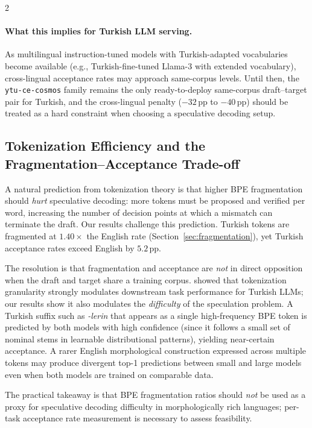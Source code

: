 \documentclass[11pt,a4paper]{article}
\begin{document}
\begin{multicols}{2}
\paragraph{What this implies for Turkish LLM serving.}
As multilingual instruction-tuned models with Turkish-adapted
vocabularies become available (e.g., Turkish-fine-tuned Llama-3 with
extended vocabulary), cross-lingual acceptance rates may approach
same-corpus levels.
Until then, the \texttt{ytu-ce-cosmos} family remains the only
ready-to-deploy same-corpus draft--target pair for Turkish, and
the cross-lingual penalty ($-32$\,pp to $-40$\,pp) should be treated
as a hard constraint when choosing a speculative decoding setup.

\subsection{Tokenization Efficiency and the Fragmentation--Acceptance Trade-off}
\label{sec:disc-tokenization}

A natural prediction from tokenization theory is that higher BPE
fragmentation should \emph{hurt} speculative decoding: more tokens must
be proposed and verified per word, increasing the number of decision
points at which a mismatch can terminate the draft.
Our results challenge this prediction.
Turkish tokens are fragmented at $1.40\!\times$ the English rate
(Section~\ref{sec:fragmentation}), yet Turkish acceptance rates exceed English
by $5.2$\,pp.

The resolution is that fragmentation and acceptance are \emph{not}
in direct opposition when the draft and target share a training corpus.
\citet{kaya2022tokenization} showed that tokenization granularity
strongly modulates downstream task performance for Turkish LLMs;
our results show it also modulates the \emph{difficulty} of the
speculation problem.
A Turkish suffix such as \textit{-lerin} that appears as a single
high-frequency BPE token is predicted by both models with high
confidence (since it follows a small set of nominal stems in
learnable distributional patterns), yielding near-certain acceptance.
A rarer English morphological construction expressed across multiple
tokens may produce divergent top-1 predictions between small and
large models even when both models are trained on comparable data.

The practical takeaway is that BPE fragmentation ratios should
\emph{not} be used as a proxy for speculative decoding difficulty in
morphologically rich languages; per-task acceptance rate measurement
is necessary to assess feasibility.


\end{multicols}
\end{document}
